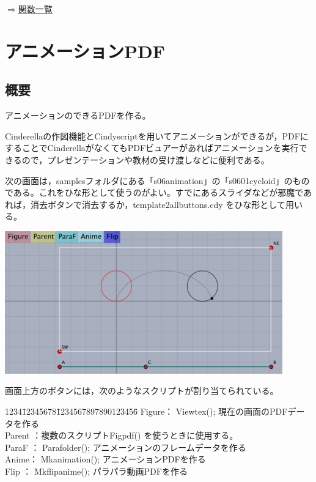 \documentclass[papersize,a4paper,12pt,uplatex]{jsarticle}
\begin{document}
\begin{flushright}\hyperlink{functionlist}{$\Rightarrow$関数一覧}\end{flushright}

\newpage


\section{アニメーションPDF}
\subsection{概要}
アニメーションのできるPDFを作る。

Cinderellaの作図機能とCindyscriptを用いてアニメーションができるが，PDFにすることでCinderellaがなくてもPDFビュアーがあればアニメーションを実行できるので，プレゼンテーションや教材の受け渡しなどに便利である。

次の画面は，samplesフォルダにある「s06animation」の「s0601cycloid」のものである。これをひな形として使うのがよい。すでにあるスライダなどが邪魔であれば，消去ボタンで消去するか，template2allbuttons.cdy をひな形として用いる。

\vspace{\baselineskip}
\includegraphics[bb=0 0 732.04 376.02 , width=12cm]{Fig/mvgaiyou01.pdf}

画面上方のボタンには，次のようなスクリプトが割り当てられている。

\begin{tabbing}
1234\=12345678\=1234567897890123456\=\kill
\>Figure\>： Viewtex(); \>現在の画面のPDFデータを作る\\
\>Parent \>：複数のスクリプト\>Figpdf() を使うときに使用する。\\
\>ParaF \>： Parafolder(); \>アニメーションのフレームデータを作る\\
\>Anime\>： Mkanimation(); \>アニメーションPDFを作る\\
\>Flip \>： Mkflipanime(); \>パラパラ動画PDFを作る
\end{tabbing}
\end{document}
